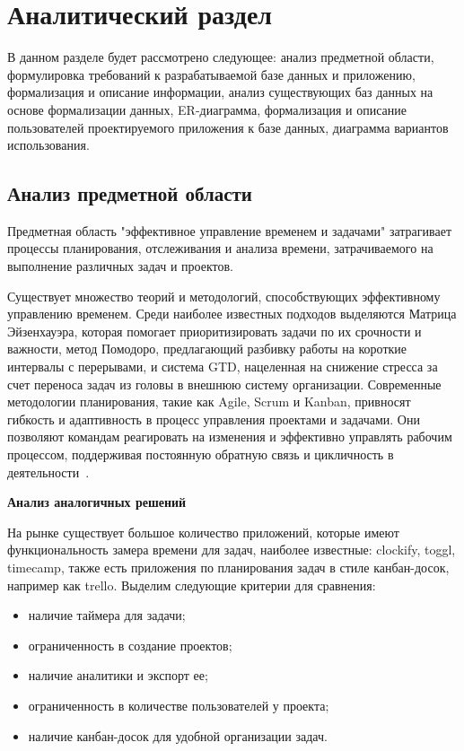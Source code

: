 
\chapter{Аналитический раздел}

В данном разделе будет рассмотрено следующее: анализ предметной области, формулировка требований к разрабатываемой базе данных и приложению, формализация и описание информации, анализ существующих баз данных на основе формализации данных, ER-диаграмма, формализация и описание пользователей проектируемого приложения к базе данных, диаграмма вариантов использования.

\section{Анализ предметной области}

Предметная область "эффективное управление временем и задачами" затрагивает процессы планирования, отслеживания и анализа времени, затрачиваемого на выполнение различных задач и проектов. 

Существует множество теорий и методологий, способствующих эффективному управлению временем.
Среди наиболее известных подходов выделяются Матрица Эйзенхауэра, которая помогает приоритизировать задачи по их срочности и важности, метод Помодоро, предлагающий разбивку работы на короткие интервалы с перерывами, и система GTD, нацеленная на снижение стресса за счет переноса задач из головы в внешнюю систему организации.
Современные методологии планирования, такие как Agile, Scrum и Kanban, привносят гибкость и адаптивность в процесс управления проектами и задачами. Они позволяют командам реагировать на изменения и эффективно управлять рабочим процессом, поддерживая постоянную обратную связь и цикличность в деятельности~\cite{matrix, main-book}.

\textbf{Анализ аналогичных решений}

На рынке существует большое количество приложений, которые имеют функциональность замера времени для задач, наиболее известные: clockify, toggl, timecamp, также есть приложения по планирования задач в стиле канбан-досок, например как trello.
Выделим следующие критерии для сравнения:
\begin{itemize}
	\item наличие таймера для задачи;
	\item ограниченность в создание проектов;
	\item наличие аналитики и экспорт ее;
	\item ограниченность в количестве пользователей у проекта;
	\item наличие канбан-досок для удобной организации задач.
\end{itemize}

